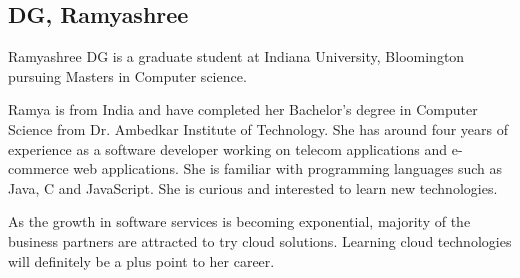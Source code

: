 \subsection{DG, Ramyashree}
Ramyashree DG is a graduate student at Indiana University, Bloomington pursuing
Masters in Computer science.

Ramya is from India and have completed her Bachelor's degree in Computer Science
from Dr. Ambedkar Institute of Technology. She has around four years of
experience as a software developer working on telecom applications and
e-commerce web applications. She is familiar with programming languages such as
Java, C and JavaScript. She is curious and interested to learn new technologies.

As the growth in software services is becoming exponential, majority of the
business partners are attracted to try cloud solutions. Learning cloud
technologies will definitely be a plus point to her career.
